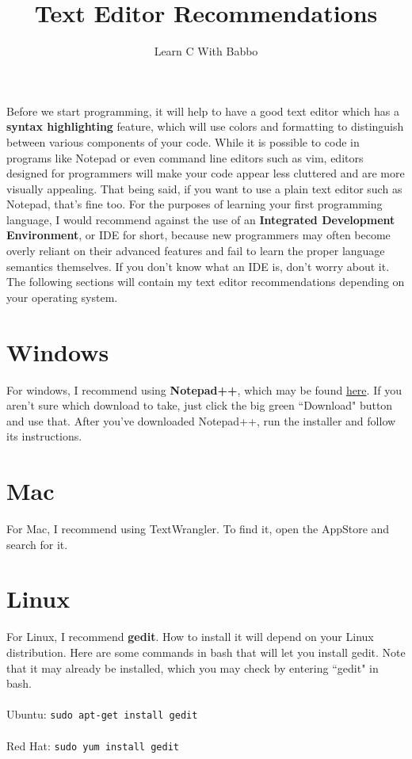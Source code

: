 \documentclass{article}
\begin{document}
\title{Text Editor Recommendations}
\author{Learn C With Babbo}
\date{}
\maketitle

\section*{}
Before we start programming, it will help to have a good text editor which has a \textbf{syntax highlighting}
feature, which will use colors and formatting to distinguish between various components of your code. While it is
possible to code in programs like Notepad or even command line editors such as vim, editors designed for programmers 
will make your code appear less cluttered and are more visually appealing. That being said, if you want to use a plain
text editor such as Notepad, that's fine too. For the purposes of learning your first programming language, 
I would recommend against the use of an \textbf{Integrated Development Environment}, or IDE for short, 
because new programmers may often become overly reliant on their advanced features and fail to learn the proper language
semantics themselves. If you don't know what an IDE is, don't worry about it. The following sections will contain my 
text editor recommendations depending on your operating system.

\section*{Windows}
For windows, I recommend using \textbf{Notepad++}, which may be found 
\href{https://notepad-plus-plus.org/download/v7.5.6.html}{here}. If you aren't sure which download to take, just click
the big green ``Download" button and use that. After you've downloaded Notepad++, run the installer and follow its
instructions.

\section*{Mac}
For Mac, I recommend using TextWrangler. To find it, open the AppStore and search for it.

\section*{Linux}
For Linux, I recommend \textbf{gedit}. How to install it will depend on your Linux distribution. Here are some commands
in bash that will let you install gedit. Note that it may already be installed, which you may check by entering ``gedit"
in bash. \\ \\
Ubuntu: \verb|sudo apt-get install gedit| \\ \\
Red Hat: \verb|sudo yum install gedit|
\end{document}

